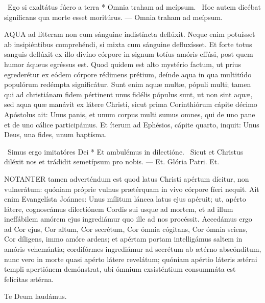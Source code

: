 \R\ Ego si exaltátus fúero a terra * Omnia traham ad meípsum. \V\ Hoc autem dicébat signíficans qua morte esset moritúrus. --- Omnia traham ad meípsum.


\lettrine[lines=2]{A}{QUA} ad lítteram non cum sánguine indistíncta deflúxit. Neque enim potuísset ab insipiéntibus comprehéndi, si mixta cum sánguine defluxísset. Et forte totus sanguis deflúxit ex illo divíno córpore in signum totíus amóris effúsi, post quem humor áqueus egréssus est. Quod quidem est alto mystério factum, ut prius egrederétur ex eódem córpore rédimens prétium, deínde aqua in qua multitúdo populórum redémpta significátur. Sunt enim aquæ multæ, pópuli multi; tamen qui ad christiánam fidem pértinent unus fidélis pópulus sunt, ut non sint aquæ, sed aqua quæ manávit ex látere Christi, sicut prima Corinthiórum cápite décimo Apóstolus ait: Unus panis, et unum corpus multi sumus omnes, qui de uno pane et de uno cálice participámus. Et íterum ad Ephésios, cápite quarto, inquit: Unus Deus, una fides, unum baptísma.

\R\ Simus ergo imitatóres Dei * Et ambulémus in dilectióne. \V\ Sicut et Christus diléxit nos et trádidit semetípsum pro nobis. --- Et. Glória Patri. Et.


\lettrine[lines=2]{N}{OTANTER} tamen adverténdum est quod latus Christi apértum dícitur, non vulnerátum: quóniam próprie vulnus prætérquam in vivo córpore fíeri nequit. Ait enim Evangelísta Joánnes: Unus mílitum láncea latus ejus apéruit; ut, apérto látere, cognoscámus dilectiónem Cordis sui usque ad mortem, et ad illum ineffábilem amórem ejus ingrediámur quo ille ad nos procéssit. Accedámus ergo ad Cor ejus, Cor altum, Cor secrétum, Cor ómnia cógitans, Cor ómnia sciens, Cor díligens, immo amóre ardens; et apértam portam intelligámus saltem in amóris vehemántia; cordifórmes ingrediámur ad secrétum ab ætérno abscónditum, nunc vero in morte quasi apérto látere revelátum; quóniam apértio láteris ætérni templi apertiónem demónstrat, ubi ómnium exsisténtium consummáta est felícitas ætérna.

Te Deum laudámus.

